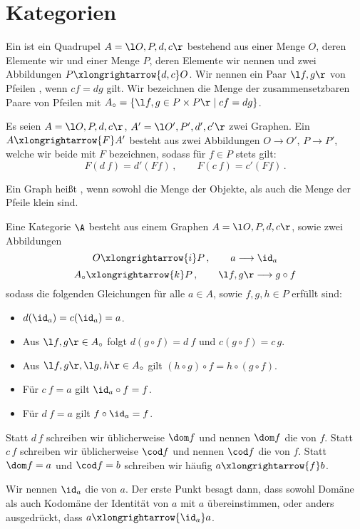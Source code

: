 \section{Kategorien}

Ein  ist ein Quadrupel $A=\l O,P,d,c \r $ bestehend aus einer Menge $O$, deren Elemente wir  und einer Menge $P$, deren Elemente wir  nennen und zwei Abbildungen $P\xlongrightarrow{d,c}O$. Wir nennen ein Paar $\l f,g\r$ von Pfeilen , wenn $cf=dg$ gilt. Wir bezeichnen die Menge der zusammensetzbaren Paare von Pfeilen mit $A_\circ=\left\{\l f,g\in P\times P\r\mid cf=dg \right\}$.

Es seien $A=\l O,P,d,c \r $, $A'=\l O',P',d',c' \r $ zwei Graphen. Ein  $A\xlongrightarrow{F} A'$ besteht aus zwei Abbildungen $O\longrightarrow O'$, $P\longrightarrow P'$, welche wir beide mit $F$ bezeichnen, sodass für $f\in P$ stets gilt:
\[F(d\ f)=d'(Ff)\,,\qquad F(c\ f)=c'(Ff)\,. \]

Ein Graph heißt , wenn sowohl die Menge der Objekte, als auch die Menge der Pfeile klein sind.

Eine Kategorie $\A$ besteht aus einem Graphen $A=\l O,P,d,c\r$, sowie zwei Abbildungen
\[O\xlongrightarrow{i} P\,,\qquad a\longrightarrow \id_a\]
\[A_\circ\xlongrightarrow{k}P\,,\qquad \l f,g\r\longrightarrow g\circ f\]
sodass die folgenden Gleichungen für alle $a\in A$, sowie $f,g,h\in P$ erfüllt sind:
\begin{itemize}
\item $d(\id_a)=c(\id_a)=a$.
\item Aus $\l f,g\r\in A_\circ$ folgt $d(g\circ f)=d\ f$ und $c(g\circ f)=c\,g$.
\item Aus $\l f,g\r,\l g,h\r\in A_\circ$ gilt $(h\circ g)\circ f=h\circ(g\circ f)$.
\item Für $c\ f=a$ gilt $\id_a\circ f=f$.
\item Für $d\ f=a$ gilt $f\circ \id_a=f$.
\end{itemize}
Statt $d\, f$ schreiben wir üblicherweise $\dom f$ und nennen $\dom f$ die  von $f$. Statt $c\, f$ schreiben wir üblicherweise $\cod f$ und nennen $\cod f$ die  von $f$. Statt $\dom f=a$ und $\cod f=b$ schreiben wir häufig $a\xlongrightarrow{f}b$.

Wir nennen $\id_a$ die  von $a$. Der erste Punkt besagt dann, dass sowohl Domäne als auch Kodomäne der Identität von $a$ mit $a$ übereinstimmen, oder anders ausgedrückt, dass $a\xlongrightarrow{\id_a}a$.

